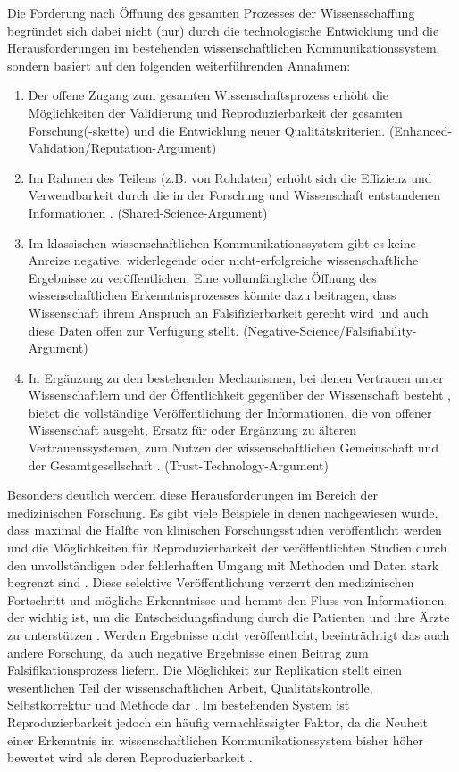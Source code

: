 Die Forderung nach Öffnung des gesamten Prozesses der Wissensschaffung begründet sich dabei nicht (nur) durch die technologische Entwicklung und die Herausforderungen im bestehenden wissenschaftlichen Kommunikationssystem, sondern basiert auf den folgenden weiterführenden Annahmen:
\begin{enumerate}
\item Der offene Zugang zum gesamten Wissenschaftsprozess erhöht die Möglichkeiten der Validierung und Reproduzierbarkeit der gesamten Forschung(-skette) \cite{Nosek_2015} \cite{Aleksic_2014} \cite{Krumholz_2014} \cite{Hey_2015} und die Entwicklung neuer Qualitätskriterien. (Enhanced-Validation/Reputation-Argument)
\item Im Rahmen des Teilens (z.B. von Rohdaten) erhöht sich die Effizienz und Verwendbarkeit durch die in der Forschung und Wissenschaft entstandenen Informationen \cite{Fecher_2015}. (Shared-Science-Argument)
\item Im klassischen wissenschaftlichen Kommunikationssystem gibt es keine Anreize negative, widerlegende oder nicht-erfolgreiche wissenschaftliche Ergebnisse zu veröffentlichen. Eine vollumfängliche Öffnung des wissenschaftlichen Erkenntnisprozesses könnte dazu beitragen, dass Wissenschaft ihrem Anspruch an Falsifizierbarkeit gerecht wird und auch diese Daten offen zur Verfügung stellt. (Negative-Science/Falsifiability-Argument)
\item In Ergänzung zu den bestehenden Mechanismen, bei denen Vertrauen unter Wissenschaftlern und der Öffentlichkeit gegenüber der Wissenschaft besteht \cite{Weingart_2005}, bietet die vollständige Veröffentlichung der Informationen, die von offener Wissenschaft ausgeht, Ersatz für oder Ergänzung zu älteren Vertrauenssystemen, zum Nutzen der wissenschaftlichen Gemeinschaft und der Gesamtgesellschaft \cite{Grand_2012}. (Trust-Technology-Argument)
\end{enumerate}

Besonders deutlich werdem diese Herausforderungen im Bereich der medizinischen Forschung. Es gibt viele Beispiele in denen nachgewiesen wurde, dass maximal die Hälfte von klinischen Forschungsstudien veröffentlicht werden \cite[:86]{Chalmers_2009} und die Möglichkeiten für Reproduzierbarkeit der veröffentlichten Studien durch den unvollständigen oder fehlerhaften Umgang mit Methoden und Daten stark begrenzt sind \cite{Dechartres_2015} \cite{Chan_2014}. Diese selektive Veröffentlichung verzerrt den medizinischen Fortschritt und mögliche Erkenntnisse und hemmt den Fluss von Informationen, der wichtig ist, um die Entscheidungsfindung durch die Patienten und ihre Ärzte zu unterstützen \cite{Ross_2013}. Werden Ergebnisse nicht veröffentlicht, beeinträchtigt das auch andere Forschung, da auch negative Ergebnisse einen Beitrag zum Falsifikationsprozess liefern. Die Möglichkeit zur Replikation stellt einen wesentlichen Teil der wissenschaftlichen Arbeit, Qualitätskontrolle, Selbstkorrektur und Methode dar \cite{Nosek_2015}. Im bestehenden System ist Reproduzierbarkeit jedoch ein häufig vernachlässigter Faktor, da die Neuheit einer Erkenntnis im wissenschaftlichen Kommunikationssystem bisher höher bewertet wird als deren Reproduzierbarkeit \cite{Nosek_2015}.

